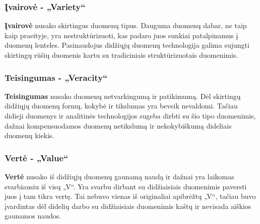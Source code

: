 \documentclass{VUMIFPSkursinis}
\begin{document}
\subsubsection{Įvairovė - „Variety“} \label{subsubsec:įvairovė}
\textbf{Įvairovė} nusako skirtingus duomenų tipus. Dauguma duomenų dabar, ne taip kaip praeityje, yra nestruktūrizuoti, kas padaro juos sunkiai patalpinamus į duomenų lenteles. Pasinaudojus didžiųjų duomenų technologija galima sujungti skirtingų rūšių duomenis kartu su tradiciniais struktūrizuotais duomenimis.

\subsubsection{Teisingumas - „Veracity“} \label{subsubsec:teisingumas}
\textbf{Teisingumas} nusako duomenų netvarkingumą ir patikimumą. Dėl skirtingų didžiųjų duomenų formų, kokybė ir tikslumas yra beveik nevaldomi. Tačiau didieji duomenys ir analitinės technologijos sugeba dirbti su šio tipo duomenimis, dažnai kompensuodamos duomenų netikslumą ir nekokybiškumą dideliais duomenų kiekis.

\subsubsection{Vertė - „Value“} \label{subsubsec:vertė}
\textbf{Vertė} nusako iš didžiųjų duomenų gaunamą naudą ir dažnai yra laikomas svarbiausiu iš visų „V“. Yra svarbu dirbant su didžiaisiais duomenimis paversti juos į tam tikra vertę. Tai nebuvo vienas iš originaliai apibrėžtų „V“, tačiau buvo įvardintas dėl didelių darbo su didžiaisiais duomenimis kaštų ir nevisada aiškios gaunamos naudos.
\end{document}
